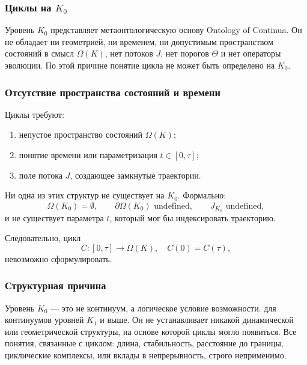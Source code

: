 
\subsubsection{Циклы на \texorpdfstring{$K_0$}{K_0}}
\label{sec:cycles-k0}

Уровень $K_0$ представляет метаонтологическую основу
Ontology of Continua.
Он не обладает ни геометрией, ни временем, ни допустимым пространством состояний в
смысл $\Omega(K)$, нет потоков $J$, нет порогов $\Theta$ и нет
операторы эволюции.
По этой причине понятие цикла не может быть определено на $K_0$.

\subsubsection{Отсутствие пространства состояний и времени}

Циклы требуют:
\begin{enumerate}
  \item непустое пространство состояний $\Omega(K)$;
  \item понятие времени или параметризация $t\in[0,\tau]$;
  \item поле потока $J$, создающее замкнутые траектории.
\end{enumerate}

Ни одна из этих структур не существует на $K_0$.
Формально:
\[
  \Omega(K_0)=\emptyset, \qquad
  \partial\Omega(K_0) \text{ undefined}, \qquad
  J_{K_0} \text{ undefined},
\]
и не существует параметра $t$, который мог бы индексировать траекторию.

Следовательно, цикл
\[
  C:[0,\tau]\to\Omega(K), \quad C(0)=C(\tau),
\]
невозможно сформулировать.

\subsubsection{Структурная причина}

Уровень $K_0$ — это не континуум, а логическое условие возможности.
для континуумов уровней $K_1$ и выше.
Он не устанавливает никакой динамической или геометрической структуры, на основе которой циклы
могло появиться.
Все понятия, связанные с циклом: длина, стабильность, расстояние до границы,
циклические комплексы, или вклады в непрерывность, строго
неприменимо.

